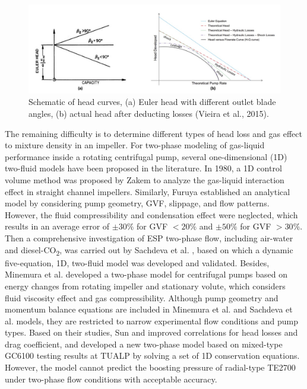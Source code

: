 \documentclass[preprint,12pt]{elsarticle}
\begin{document}
\begin{figure}[ht]
    \label{fig:headLossType}
    \centering\includegraphics[width=1\linewidth]{head loss type.jpg}
    \caption{Schematic of head curves, (a) Euler head with different outlet blade angles, (b) actual head after deducting losses (Vieira et al., 2015).}
\end{figure}

The remaining difficulty is to determine different types of head loss and gas effect to mixture density in an impeller. For two-phase modeling of gas-liquid performance inside a rotating centrifugal pump, several one-dimensional (1D) two-fluid models have been proposed in the literature. In 1980, a 1D control volume method was proposed by Zakem to analyze the gas-liquid interaction effect in straight channel impellers. Similarly, Furuya \cite{furuya1985analytical} established an analytical model by considering pump geometry, GVF, slippage, and flow patterns. However, the fluid compressibility and condensation effect were neglected, which results in an average error of $\pm{30\%}$ for GVF $< 20\%$ and $\pm50\%$ for GVF $> 30\%$. Then a comprehensive investigation of ESP two-phase flow, including air-water and diesel-CO\textsubscript{2}, was carried out by Sachdeva et al. \cite{sachdeva1988two,sachdeva1994performance}, based on which a dynamic five-equation, 1D, two-fluid model was developed and validated. Besides, Minemura et al. \cite{minemura1998prediction} developed a two-phase model for centrifugal pumps based on energy changes from rotating impeller and stationary volute, which considers fluid viscosity effect and gas compressibility. Although pump geometry and momentum balance equations are included in Minemura et al. \cite{minemura1998prediction} and Sachdeva et al. \cite{sachdeva1994performance} models, they are restricted to narrow experimental flow conditions and pump types. Based on their studies, Sun \cite{sun2003,sun2005modeling} and improved correlations for head losses and drag coefficient, and developed a new two-phase model based on mixed-type GC6100 testing results at TUALP by solving a set of 1D conservation equations. However, the model cannot predict the boosting pressure of radial-type TE2700 under two-phase flow conditions with acceptable accuracy. 
\end{document}
